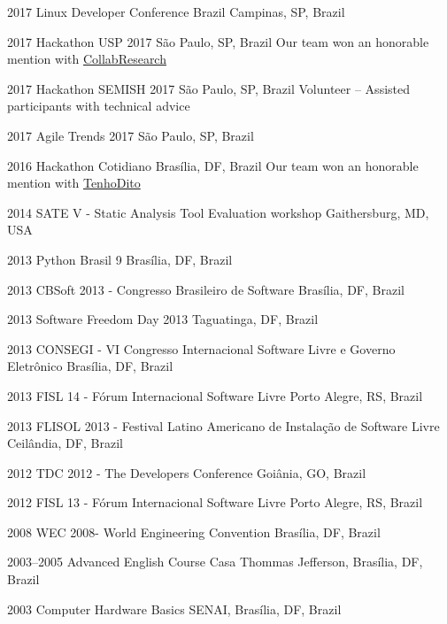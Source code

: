 \documentclass[print]{friggeri-cv}
\begin{document}
\begin{entrylist}


\entry
{2017}
{Linux Developer Conference Brazil}
{Campinas, SP, Brazil}
  {}

\entry
{2017}
{Hackathon USP 2017}
{São Paulo, SP, Brazil}
  {Our team won an honorable mention with \href{https://devpost.com/software/collab-research}{CollabResearch}}

\entry
{2017}
{Hackathon SEMISH 2017}
{São Paulo, SP, Brazil}
  {Volunteer -- Assisted participants with technical advice}

\entry
{2017}
{Agile Trends 2017}
{São Paulo, SP, Brazil}
  {}

\entry
{2016}
{Hackathon Cotidiano}
{Brasília, DF, Brazil}
  {Our team won an honorable mention with \href{https://github.com/tenhodito}{TenhoDito}}

\end{entrylist}
\begin{entrylist}

\entry
{2014}
{SATE V - Static Analysis Tool Evaluation workshop}
{Gaithersburg, MD, USA}
{}

\entry
{2013}
{Python Brasil 9}
{Brasília, DF, Brazil}
{}

\entry
{2013}
{CBSoft 2013 - Congresso Brasileiro de Software}
{Brasília, DF, Brazil}
{}

\entry
{2013}
{Software Freedom Day 2013}
{Taguatinga, DF, Brazil}
{}

\entry
{2013}
{CONSEGI - VI Congresso Internacional Software Livre e Governo Eletrônico}
{Brasília, DF, Brazil}
{}

\entry
{2013}
{FISL 14 - Fórum Internacional Software Livre}
{Porto Alegre, RS, Brazil}
{}

\entry
{2013}
{FLISOL 2013 - Festival Latino Americano de Instalação de Software Livre}
{Ceilândia, DF, Brazil}
{}

\end{entrylist}
\begin{entrylist}


\entry
{2012}
{TDC 2012 - The Developers Conference}
{Goiânia, GO, Brazil}
{}

\entry
{2012}
{FISL 13 - Fórum Internacional Software Livre}
{Porto Alegre, RS, Brazil}
{}

\entry
{2008}
{WEC  2008- World Engineering Convention}
{Brasília, DF, Brazil}
{}

\entry
{2003--2005}
{Advanced English Course}
{Casa Thommas Jefferson, Brasília, DF, Brazil}
{}

\entry
{2003}
{Computer Hardware Basics}
{SENAI, Brasília, DF, Brazil}
{}

\end{entrylist}
\end{document}
